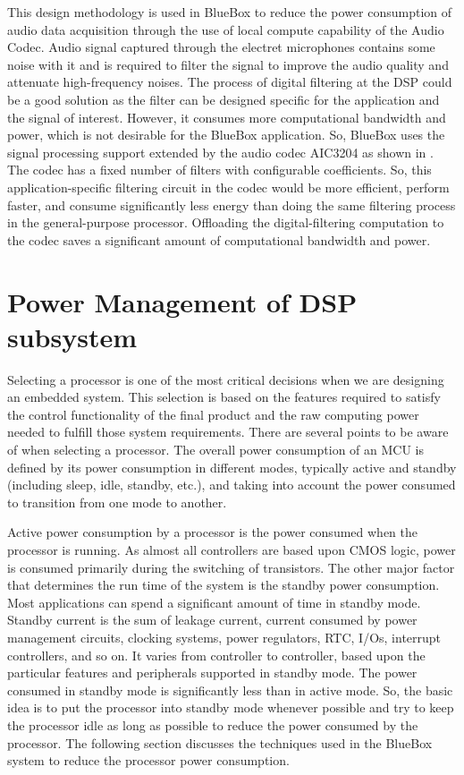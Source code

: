 This design methodology is used in BlueBox to reduce the power
consumption of audio data acquisition through the use of local
compute capability of the Audio Codec. Audio signal captured through
the electret microphones contains some noise with it and is required
to filter the signal to improve the audio quality and attenuate
high-frequency noises. The process of digital filtering at the DSP
could be a good solution as the filter can be designed specific for
the application and the signal of interest. However, it consumes more
computational bandwidth and power, which is not desirable for the
BlueBox application. So, BlueBox uses the signal processing support
extended by the audio codec AIC3204 as shown in
. The codec has a fixed number of filters
with configurable coefficients. So, this application-specific
filtering circuit in the codec would be more efficient, perform
faster, and consume significantly less energy than doing the same
filtering process in the general-purpose processor. Offloading the
digital-filtering computation to the codec saves a significant amount
of computational bandwidth and power.
 
\section{Power Management of DSP subsystem }

Selecting a processor is one of the most critical decisions when we
are designing an embedded system. This selection is based on the
features required to satisfy the control functionality of the final
product and the raw computing power needed to fulfill those system
requirements. There are several points to be aware of when selecting
a processor. The overall power consumption of an MCU is defined by
its power consumption in different modes, typically active and
standby (including sleep, idle, standby, etc.), and taking into
account the power consumed to transition from one mode to another. 

Active power consumption by a processor is the power consumed when
the processor is running. As almost all controllers are based upon
CMOS logic, power is consumed primarily during the switching of
transistors. The other major factor that determines the run time of
the system is the standby power consumption. Most applications can
spend a significant amount of time in standby mode. Standby current
is the sum of leakage current, current consumed by power management
circuits, clocking systems, power regulators, RTC, I/Os, interrupt
controllers, and so on. It varies from controller to controller,
based upon the particular features and peripherals supported in
standby mode. The power consumed in standby mode is significantly
less than in active mode. So, the basic idea is to put the processor
into standby mode whenever possible and try to keep the processor
idle as long as possible to reduce the power consumed by the
processor. The following section discusses the techniques used in the
BlueBox system to reduce the processor power consumption. 

